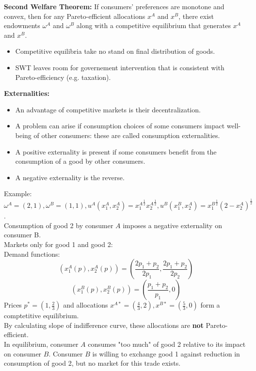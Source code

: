 \documentclass[12pt]{article}
\newcommand{\opxa}{x^{A\ast}}
\newcommand{\opxb}{x^{B\ast}}
\newcommand{\opp}{p^{\ast}}
\begin{document}
\noindent
\textbf{Second Welfare Theorem:} If consumers' preferences are monotone and convex, then for any Pareto-efficient allocations $x^A$ and $x^B$, there exist endowments $\omega^A$ and $\omega^B$ along with a competitive equilibrium that generates $x^A$ and $x^B$. 
\begin{itemize}
	\item Competitive equilibria take no stand on final distribution of goods. 
	\item SWT leaves room for governement intervention that is consistent with Pareto-efficiency (e.g. taxation). 
\end{itemize}

\noindent
\textbf{Externalities:}
\begin{itemize}
	\item An advantage of competitive markets is their decentralization.
	\item A problem can arise if consumption choices of some consumers impact well-being of other consumers: these are called consumption externalities.
	\item A positive externality is present if some consumers benefit from the consumption of a good by other consumers.
	\item A negative externality is the reverse.
\end{itemize}

\noindent
Example:\\
$\omega^A = (2,1), \omega^B = (1,1), u^A(x^A_1, x^A_2) = {x^A_1}^\frac{1}{2}{x^A_2}^\frac{1}{2}, u^B(x^B_1, x^A_2) = {x^B_1}^\frac{1}{2}{(2-x^A_2)}^\frac{1}{2}$. \\
Consumption of good 2 by consumer $A$ imposes a negative externality on consumer B. \\

\noindent
Markets only for good 1 and good 2:\\
Demand functions:\\
\[(x^A_1(p), x^A_2(p)) = (\frac{2p_1+p_2}{2p_1},\frac{2p_1+p_2}{2p_2})\]
\[(x^B_1(p), x^B_2(p)) = (\frac{p_1+p_2}{p_1},0)\]
Prices $\opp = (1, \frac{2}{3})$ and allocations $\opxa = (\frac{4}{3}, 2), \opxb=(\frac{5}{3}, 0)$ form a comptetitive equilibrium. \\

\noindent
By calculating slope of indifference curve, these allocations are \textbf{not} Pareto-efficient.\\
In equilibrium, consumer $A$ consumes "too much" of good 2 relative to its impact on consumer $B$. Consumer $B$ is willing to exchange good 1 against reduction in consumption of good 2, but no market for this trade exists.\\
\end{document}
